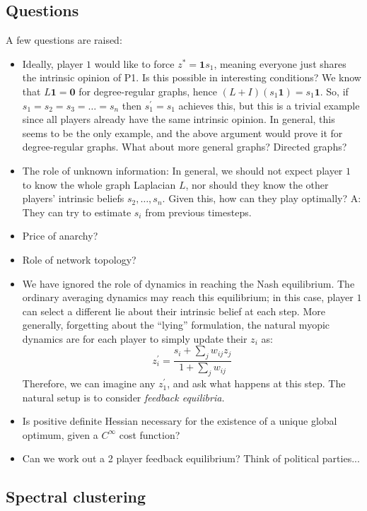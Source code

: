 \subsection{Questions} 
A few questions are raised: 
\begin{itemize}
    \item Ideally, player $1$ would like to force $z^* = \bm{1} s_1$, meaning everyone just shares the intrinsic opinion of P1. Is this possible in interesting conditions? We know that $L \bm{1} = \bm{0}$ for degree-regular graphs, hence $(L + I) (s_1 \bm{1}) = s_1 \bm{1}$. So, if $s_1 = s_2 = s_3 = \dots = s_n$ then $s_1^\prime = s_1$ achieves this, but this is a trivial example since all players already have the same intrinsic opinion. In general, this seems to be the only example, and the above argument would prove it for degree-regular graphs. What about more general graphs? Directed graphs? 
    \item The role of unknown information: In general, we should not expect player $1$ to know the whole graph Laplacian $L$, nor should they know the other players' intrinsic beliefs $s_2, \dots, s_n$. Given this, how can they play optimally? A: They can try to estimate $s_i$ from previous timesteps. 
    \item Price of anarchy? 
    \item Role of network topology? 
    \item We have ignored the role of dynamics in reaching the Nash equilibrium. The ordinary averaging dynamics may reach this equilibrium; in this case, player $1$ can select a different lie about their intrinsic belief at each step. More generally, forgetting about the ``lying'' formulation, the natural myopic dynamics are for each player to simply update their $z_i$ as: 
    \[
    z_i^\prime = \frac{s_i + \sum_j w_{ij} z_j}{1 + \sum_j w_{ij}}
    \]
    Therefore, we can imagine any $z_1^\prime$, and ask what happens at this step. The natural setup is to consider {\em feedback equilibria.} 
    \item Is positive definite Hessian necessary for the existence of a unique global optimum, given a $C^\infty$ cost function? 
    \item Can we work out a 2 player feedback equilibrium? Think of political parties...
\end{itemize}

\subsection{Spectral clustering}

